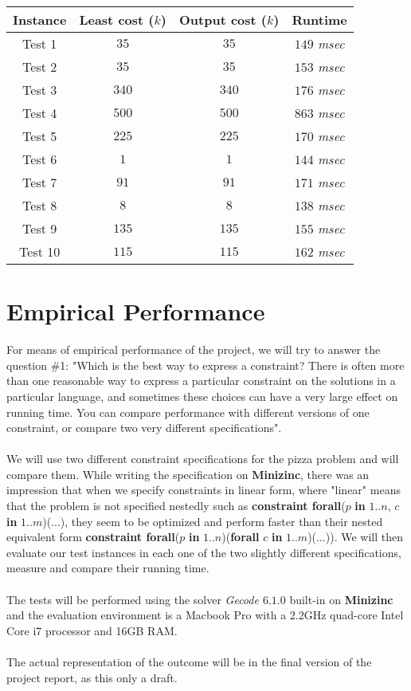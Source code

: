 \documentclass[conference]{IEEEtran}
\newcommand\tab[1][0.3cm]{\hspace*{#1}}
\begin{document}
\begin{tabular}{ c | c | c | c}
 \hline
  Instance & Least cost ($k$) & Output cost ($k$) & Runtime
  \\ \hline
      Test 1 & $35$ & $35$ & $149$ \textit{msec}\\ \hline 
      Test 2 & $35$ & $35$  &  $153$ \textit{msec}  \\ \hline
      Test 3 & $340$& $340$ &  $176$ \textit{msec} \\ \hline
      Test 4 & $500$ & $500$ &  $863$ \textit{msec} \\ \hline
      Test 5 & $225$ & $225$ &  $170$ \textit{msec} \\ \hline
      Test 6 & $1$ & $1$  &  $144$ \textit{msec} \\ \hline
      Test 7 & $91$ & $91$  &  $171$ \textit{msec} \\ \hline
      Test 8 & $8$ & $8$  &  $138$ \textit{msec} \\ \hline
      Test 9 & $135$ & $135$  &  $155$ \textit{msec} \\ \hline
      Test 10 & $115$ & $115$  &  $162$ \textit{msec} \\ \hline
  \end{tabular}
\section{Empirical Performance}
For means of empirical performance of the project, we will try to answer the question \#1: "Which is the best way to express a constraint? There is often more than one reasonable way to express a particular constraint on the solutions in a particular language, and sometimes these choices can have a very large effect on running time. You can compare performance with different versions of one constraint, or compare two very different specifications".
\\
\\
\tab We will use two different constraint specifications for the pizza problem and will compare them. While writing the specification on \textbf{Minizinc}, there was an impression that when we specify constraints in linear form, where "linear" means that the problem is not specified nestedly such as \textbf{constraint forall}($p$ \textbf{in} $1..n$, $c$ \textbf{in} $1..m$)($...$), they seem to be optimized and perform faster than their nested equivalent form \textbf{constraint forall}($p$ \textbf{in} $1..n$)(\textbf{forall} $c$ \textbf{in} $1..m$)($...$)). We will then evaluate our test instances in each one of the two slightly different specifications, measure and compare their running time.
\\
\\
\tab The tests will be performed using the solver \textit{Gecode $6.1.0$} built-in on \textbf{Minizinc} and the evaluation environment is a Macbook Pro with a 2.2GHz quad-core Intel Core i7 processor and 16GB RAM.
\\
\\
The actual representation of the outcome will be in the final version of the project report, as this only a draft.
\end{document}
